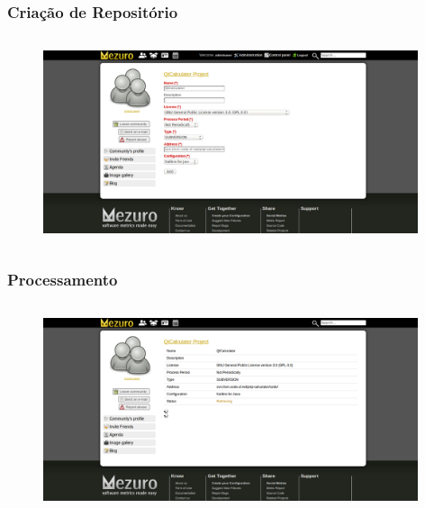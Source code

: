 \documentclass{beamer}
\begin{document}
    \begin{frame}
      \frametitle{Criação de Repositório}
      \framesubtitle{}

      \begin{figure}
        \begin{center}
          \includegraphics[width=11cm, height=6cm]{images/07-repository-creation.png}
          \label{fig:repository-creation}
        \end{center}
      \end{figure}
    \end{frame}

    \begin{frame}
      \frametitle{Processamento}
      \framesubtitle{}

      \begin{figure}
        \begin{center}
          \includegraphics[width=11cm, height=6cm]{images/08-processing.png}
          \label{fig:processing}
        \end{center}
      \end{figure}
    \end{frame}
\end{document}
